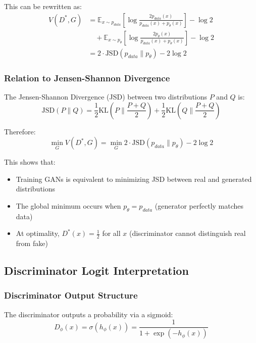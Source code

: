 \documentclass[conference,12pt]{IEEEtran}
\begin{document}
This can be rewritten as:
\begin{align}
    V(D^*, G) &= \mathbb{E}_{x \sim p_{data}} \left[ \log \frac{2p_{data}(x)}{p_{data}(x) + p_\theta(x)} \right] - \log 2 \\
    &\quad + \mathbb{E}_{x \sim p_\theta} \left[ \log \frac{2p_\theta(x)}{p_{data}(x) + p_\theta(x)} \right] - \log 2 \\
    &= 2 \cdot \text{JSD}(p_{data} \| p_\theta) - 2\log 2
\end{align}

\subsubsection{Relation to Jensen-Shannon Divergence}

The Jensen-Shannon Divergence (JSD) between two distributions $P$ and $Q$ is:
\begin{equation}
    \text{JSD}(P \| Q) = \frac{1}{2} \text{KL}\left(P \| \frac{P+Q}{2}\right) + \frac{1}{2} \text{KL}\left(Q \| \frac{P+Q}{2}\right)
\end{equation}

Therefore:
\begin{equation}
    \min_G V(D^*, G) = \min_G 2 \cdot \text{JSD}(p_{data} \| p_\theta) - 2\log 2
\end{equation}

This shows that:
\begin{itemize}
    \item Training GANs is equivalent to minimizing JSD between real and generated distributions
    \item The global minimum occurs when $p_\theta = p_{data}$ (generator perfectly matches data)
    \item At optimality, $D^*(x) = \frac{1}{2}$ for all $x$ (discriminator cannot distinguish real from fake)
\end{itemize}

\subsection{Discriminator Logit Interpretation}

\subsubsection{Discriminator Output Structure}

The discriminator outputs a probability via a sigmoid:
\begin{equation}
    D_\phi(x) = \sigma(h_\phi(x)) = \frac{1}{1 + \exp(-h_\phi(x))}
\end{equation}
\end{document}
